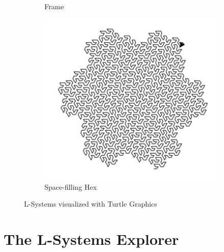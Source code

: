 \documentclass[12pt,twoside]{reedthesis}
\begin{document}
\begin{figure}[h]
\begin{subfigure}{0.5\textwidth}
		\caption{Frame\footnotemark}
		\label {TurtleGraphics5}
	\end{subfigure}
	\centering
	\begin{subfigure}{0.5\textwidth}
		\centering
		\includegraphics[height = 0.9\textwidth]{Images/TurtleGraphics6}
		\caption{Space-filling Hex\footnotemark}
		\label {TurtleGraphics6}
	\end{subfigure}
	
	\caption[L-Systems visualized with Turtle Graphics]{L-Systems visualized with Turtle Graphics}
	\label{TurtleFractals}
	\end{figure}
	
	\addtocounter{footnote}{-3}
	\addtocounter{footnote}{1}
	\addtocounter{footnote}{1}
	\addtocounter{footnote}{1}

\chapter{The L-Systems Explorer}
\end{document}
